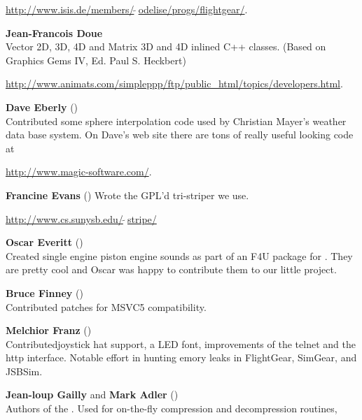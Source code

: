   \href{http://www.isis.de/members/~odelise/progs/flightgear/}{http://www.isis.de/members/$\tilde{~~}$odelise/progs/flightgear/}.
\medskip

\noindent \textbf{Jean-Francois Doue}\\
  Vector 2D, 3D, 4D and Matrix 3D and 4D inlined C++ classes.  (Based on
  Graphics Gems IV, Ed. Paul S. Heckbert)
  \medskip

\href{http://www.animats.com/simpleppp/ftp/public_html/topics/developers.html}{http://www.animats.com/simpleppp/ftp/public\_html/topics/developers.html}.
 \medskip

\noindent \textbf{Dave Eberly}  ()\\
  Contributed some sphere interpolation code used by Christian Mayer's
  weather data base system.  On Dave's web site there are tons of
  really useful looking code at
  \medskip

\href{http://www.magic-software.com/}{http://www.magic-software.com/}.
  \medskip

\noindent \textbf{Francine Evans} ()
  Wrote the GPL'd tri-striper we use.
  \medskip

\href{http://www.cs.sunysb.edu/~stripe/}{http://www.cs.sunysb.edu/$\tilde{~~}$stripe/}
\medskip

\noindent \textbf{Oscar Everitt} ()\\
  Created single engine piston engine sounds as part of an F4U package
  for .  They are pretty cool and Oscar was happy to contribute
  them to our little project.
 \medskip

\noindent \textbf{Bruce Finney} ()\\
  Contributed patches for MSVC5 compatibility.
 \medskip

\noindent \textbf{Melchior Franz} ()\\
  Contributedjoystick hat support, a LED font, improvements of the telnet and the http interface.
  Notable effort in hunting emory leaks in FlightGear, SimGear, and JSBSim.
  \medskip

\noindent \textbf{Jean-loup Gailly} and \textbf{Mark
Adler} ()\\
  Authors of the .  Used for on-the-fly compression and
  decompression routines,

